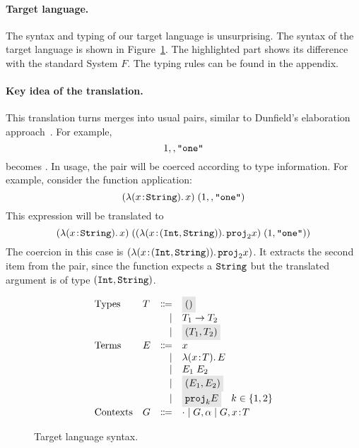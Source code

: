 \paragraph{Target language.}
The syntax and typing of our target language is unsurprising. The syntax of the
target language is shown in Figure~\ref{fig:f-syntax}. The highlighted part
shows its difference with the standard System $F$. The typing rules can be found
in the appendix.

\paragraph{Key idea of the translation.}
This translation turns merges into usual pairs, similar to Dunfield's
elaboration approach~\cite{dunfield2014elaborating}.
For example, \[ 1 ,, \texttt{"one"} \] becomes 
{}. In usage, the pair will be coerced according to type
information. For example, consider the function application: \[ (\lambda (x \!:\! \texttt{String}).\, x) \; (1 ,, \texttt{"one"}) \] This expression will be translated to \[ (\lambda (x \!:\! \texttt{String}).\, x) \; ((\lambda (x \!:\! (\texttt{Int}, \texttt{String})).\, {\texttt{proj}}_{2} x) \; (1, \texttt{"one"})) \] The coercion in this case is $(\lambda (x \!:\! (\texttt{Int}, \texttt{String})).\, {\texttt{proj}}_{2} x)$. It extracts the second item from the pair, since
the function expects a $\texttt{String}$ but the translated argument is of type $(\texttt{Int}, \texttt{String})$.


\begin{figure}[h]
  \[
    \begin{array}{llrl}
      \text{Types}    & T & \Coloneqq & \highlight {$ () $} \\
                      &   & \mid      & {T_1} \to {T_2} \\
                      &   & \mid      & \highlight {$ \pair {T_1} {T_2} $} \\
      \text{Terms}    & E & \Coloneqq & x \\
                      &   & \mid      & \lamty x T E \\
                      &   & \mid      & \app {E_1} {E_2} \\
                      &   & \mid      & \highlight {$ \pair {E_1} {E_2} $} \\
                      &   & \mid      & \highlight {$ \proj k E $} \quad k \in \{ 1, 2 \} \\
      \text{Contexts} & G & \Coloneqq & \cdot \mid G, \alpha \mid G, x \oftype T \\
    \end{array}
  \]
  \caption{Target language syntax.}
  \label{fig:f-syntax}
\end{figure}

